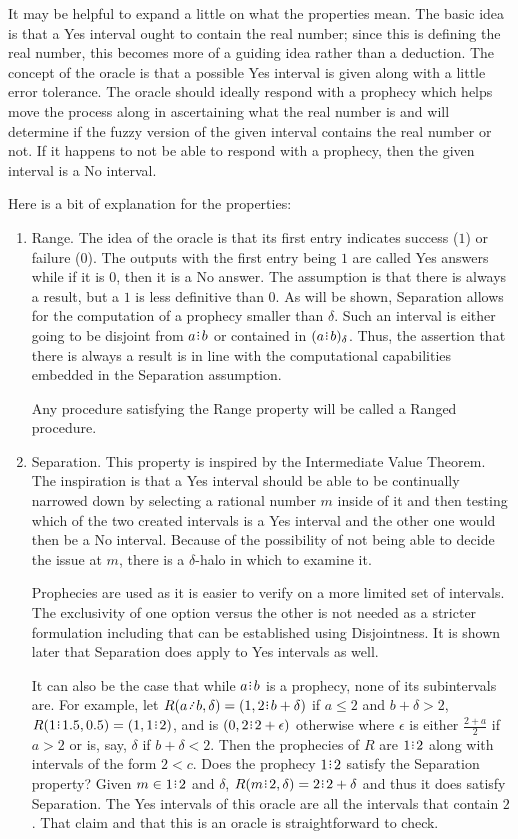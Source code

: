 \documentclass[12pt]{article}
\begin{document}
It may be helpful to expand a little on what the properties mean. The basic idea is that a Yes interval ought to contain the real number; since this is defining the real number, this becomes more of a guiding idea rather than a deduction. The concept of the oracle is that a possible Yes interval is given along with a little error tolerance. The oracle should ideally respond with a prophecy which helps move the process along in ascertaining what the real number is and will determine if the fuzzy version of the given interval contains the real number or not. If it happens to not be able to respond with a prophecy, then the given interval is a No interval. 

Here is a bit of explanation for the properties: 
\begin{enumerate}
    \item Range. The idea of the oracle is that its first entry indicates success ($1$) or failure ($0$). The outputs with the first entry being $1$ are called Yes answers while if it is $0$, then it is a No answer. The assumption is that there is always a result, but a $1$ is less definitive than $0$. As will be shown, Separation allows for the computation of a prophecy smaller than $\delta$. Such an interval is either going to be disjoint from $a \rint b$ or contained in $\halo{a\rint b}$. Thus, the assertion that there is always a result is in line with the computational capabilities embedded in the Separation assumption. 

    Any procedure satisfying the Range property will be called a Ranged procedure. 


    \item Separation. This property is inspired by the Intermediate Value Theorem. The inspiration is that a Yes interval should be able to be continually narrowed down by selecting a rational number $m$ inside of it and then testing which of the two created intervals is a Yes interval and the other one would then be a No interval. Because of the possibility of not being able to decide the issue at $m$, there is a $\delta$-halo in which to examine it. 

    Prophecies are used as it is easier to verify on a more limited set of intervals. The exclusivity of one option versus the other is not needed as a stricter formulation including that can be established using Disjointness. It is shown later that Separation does apply to Yes intervals as well. 
    
    It can also be the case that while $a\rint b$ is a prophecy, none of its subintervals are. For example, let $R(a \lte  b, \delta) = (1, 2\rint  b+ \delta)$ if $a \leq 2$ and $b + \delta > 2$,  $R(1\rint 1.5, 0.5) = (1, 1\rint 2)$, and is $(0, 2\rint 2+\epsilon)$ otherwise where $\epsilon$ is either $\frac{2+a}{2}$ if $a > 2$ or is, say, $\delta$ if $b+\delta < 2$. Then the prophecies of $R$ are  $1\rint 2$ along with intervals of the form $2 \lt  c$. Does the prophecy $1\rint 2$ satisfy the Separation property? Given $m \in 1\rint 2$ and $\delta$, $R(m \rint 2, \delta) = 2\rint 2+\delta$ and thus it does satisfy Separation. The Yes intervals of this oracle are all the intervals that contain $2$. That claim and that this is an oracle is straightforward to check.  
    

\end{enumerate}
\end{document}
